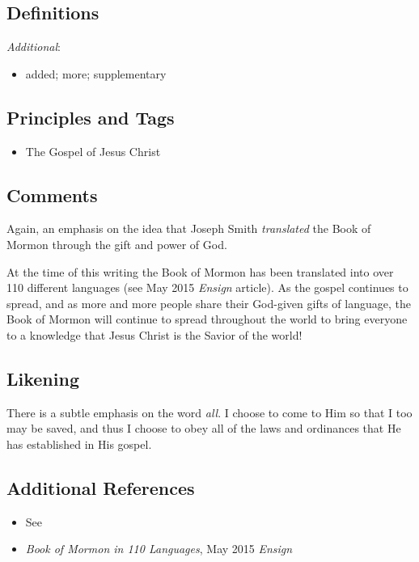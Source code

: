\documentclass[12pt]{report}
\begin{document}
\subsection{Definitions\label{intro:DFN5}}
\emph{Additional}: \begin{itemize}
\item added; more; supplementary
\end{itemize}
\subsection{Principles and Tags\label{intro:principles5}}
\begin{itemize}
\item {} The Gospel of Jesus Christ
\end{itemize}

\subsection{Comments\label{intro:comments5}}
Again, an emphasis on the idea that Joseph Smith \emph{translated} the Book of Mormon through the gift and power of God.

At the time of this writing the Book of Mormon has been translated into over 110 different languages (see May 2015 \emph{Ensign} article).  As the gospel continues to spread, and as more and more people share their God-given gifts of language, the Book of Mormon will continue to spread throughout the world to bring everyone to a knowledge that Jesus Christ is the Savior of the world!

\subsection{Likening\label{intro:likening5}}
There is a subtle emphasis on the word \emph{all}.  I choose to come to Him so that I too may be saved, and thus I choose to obey all of the laws and ordinances that He has established in His gospel.

\subsection{Additional References\label{intro:references5}}
\begin{itemize}
\item See 
\item \emph{Book of Mormon in 110 Languages}, May 2015 \emph{Ensign}
\end{itemize}
\end{document}

